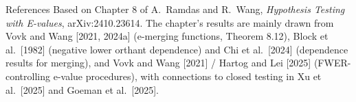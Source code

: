 \documentclass[aspectratio=169,10pt]{beamer}
\begin{document}
\begin{frame}{References}
  \small
  Based on Chapter 8 of A.\ Ramdas and R.\ Wang, \emph{Hypothesis Testing with E-values}, arXiv:2410.23614. The chapter's results are mainly drawn from Vovk and Wang [2021, 2024a] (e-merging functions, Theorem 8.12), Block et al.\ [1982] (negative lower orthant dependence) and Chi et al.\ [2024] (dependence results for merging), and Vovk and Wang [2021] / Hartog and Lei [2025] (FWER-controlling e-value procedures), with connections to closed testing in Xu et al.\ [2025] and Goeman et al.\ [2025].
\end{frame}
\end{document}
